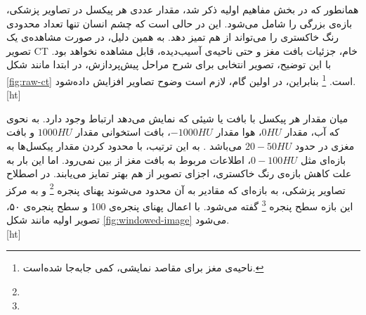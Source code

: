 همانطور که در بخش مفاهیم اولیه ذکر شد، مقدار عددی هر پیکسل در تصاویر پزشکی، بازه‌ی بزرگی را شامل می‌شود.
این در حالی است که چشم انسان تنها تعداد محدودی رنگ خاکستری را می‌تواند از هم تمیز دهد.
به همین دلیل، در صورت مشاهده‌ی یک تصویر CT خام، جزئیات بافت مغز و حتی ناحیه‌ی آسیب‌دیده، قابل مشاهده نخواهد بود. 
با این توضیح، تصویر انتخابی برای شرح مراحل پیش‌پردازش، در ابتدا مانند 
شکل \ref{fig:raw-ct} است.
\footnote{ناحیه‌ی مغز برای مقاصد نمایشی، کمی جا‌به‌جا شده‌است.}
بنابراین، در اولین گام، لازم است وضوح تصاویر افزایش داده‌شود.\\


[ht]

 میان مقدار هر پیکسل با بافت یا شیئی که نمایش می‌دهد ارتباط وجود دارد.
به نحوی که آب، مقدار $0 HU$، هوا مقدار $-1000 HU$، بافت استخوانی مقدار $1000 HU$ و بافت مغزی در حدود $20-50 HU$ می‌باشد \cite{kamalian2016computed}.
به این ترتیب، با محدود کردن مقدار پیکسل‌ها به بازه‌ای مثل $0-100 HU$، اطلاعات مربوط به بافت مغز از بین نمی‌رود.
اما این بار به علت کاهش بازه‌ی رنگ خاکستری، اجزای تصویر از هم بهتر تمایز می‌یابند.
در اصطلاح تصاویر پزشکی، به بازه‌ای که مقادیر به آن محدود می‌شوند پهنای پنجره 
\footnote{}
و به مرکز این بازه سطح پنجره 
\footnote{} گفته می‌شود.
با اعمال پهنای پنجره‌ی 100 و سطح پنجره‌ی ۵۰، تصویر اولیه مانند شکل 
\ref{fig:windowed-image}
می‌شود.\\


[ht]


